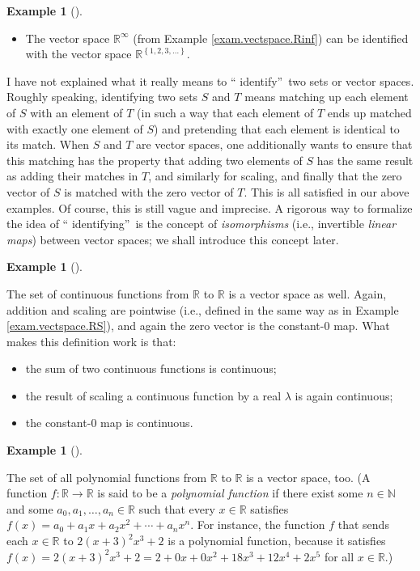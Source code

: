 \documentclass[numbers=enddot,12pt,final,onecolumn,notitlepage]{scrartcl}%
\theoremstyle{definition}
\newtheorem{exam}[theo]{Example}
\newenvironment{example}[1][]
{\begin{exam}[#1]\begin{leftbar}}
{\end{leftbar}\end{exam}}
\begin{document}
\begin{example}
\begin{itemize}
\item The vector space $\mathbb{R}^{\infty}$ (from Example
\ref{exam.vectspace.Rinf}) can be identified with the vector space
$\mathbb{R}^{\left\{  1,2,3,\ldots\right\}  }$.
\end{itemize}

I have not explained what it really means to \textquotedblleft
identify\textquotedblright\ two sets or vector spaces. Roughly speaking,
identifying two sets $S$ and $T$ means matching up each element of $S$ with an
element of $T$ (in such a way that each element of $T$ ends up matched with
exactly one element of $S$) and pretending that each element is identical to
its match. When $S$ and $T$ are vector spaces, one additionally wants to
ensure that this matching has the property that adding two elements of $S$ has
the same result as adding their matches in $T$, and similarly for scaling, and
finally that the zero vector of $S$ is matched with the zero vector of $T$.
This is all satisfied in our above examples. Of course, this is still vague
and imprecise. A rigorous way to formalize the idea of \textquotedblleft
identifying\textquotedblright\ is the concept of \textit{isomorphisms} (i.e.,
invertible \textit{linear maps}) between vector spaces; we shall introduce
this concept later.
\end{example}

\begin{example}
The set of continuous functions from $\mathbb{R}$ to $\mathbb{R}$ is a vector
space as well. Again, addition and scaling are pointwise (i.e., defined in the
same way as in Example \ref{exam.vectspace.RS}), and again the zero vector is
the constant-$0$ map. What makes this definition work is that:

\begin{itemize}
\item the sum of two continuous functions is continuous;

\item the result of scaling a continuous function by a real $\lambda$ is again continuous;

\item the constant-$0$ map is continuous.
\end{itemize}
\end{example}

\begin{example}
The set of all polynomial functions from $\mathbb{R}$ to $\mathbb{R}$ is a
vector space, too. (A function $f:\mathbb{R}\rightarrow\mathbb{R}$ is said to
be a \textit{polynomial function} if there exist some $n\in\mathbb{N}$ and
some $a_{0},a_{1},\ldots,a_{n}\in\mathbb{R}$ such that every $x\in\mathbb{R}$
satisfies $f\left(  x\right)  =a_{0}+a_{1}x+a_{2}x^{2}+\cdots+a_{n}x^{n}$. For
instance, the function $f$ that sends each $x\in\mathbb{R}$ to $2\left(
x+3\right)  ^{2}x^{3}+2$ is a polynomial function, because it satisfies
$f\left(  x\right)  =2\left(  x+3\right)  ^{2}x^{3}+2=2+0x+0x^{2}%
+18x^{3}+12x^{4}+2x^{5}$ for all $x\in\mathbb{R}$.)
\end{example}
\end{document}
